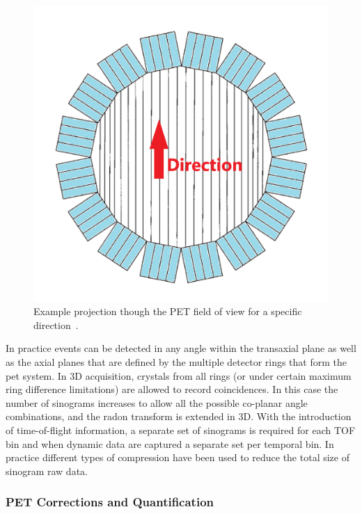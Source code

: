 \begin{itemize}
\begin{figure} [h!]
\includegraphics[scale=0.15,angle=0]{2_Theory_Methods/figures/Sinogram_detector_to_Sino.png}
\caption{Example projection though the PET field of view for a specific direction~\cite{Fahey2002}.} 
\label{fig_2:Sinogram_detector_to_Sino}
\end{figure} 
%
In practice events can be detected in any angle within the transaxial plane as well as the axial planes that are defined by the multiple detector rings that form the \gls{pet} system. In 3D acquisition, crystals from all rings (or under certain maximum ring difference limitations) are allowed to record coincidences. In this case the number of sinograms increases to allow all the possible co-planar angle combinations, and the radon transform is extended in 3D. With the introduction of time-of-flight information, a separate set of sinograms is required for each TOF bin and when dynamic data are captured a separate set per temporal bin. In practice different types of compression have been used to reduce the total size of sinogram raw data.

\end{itemize}

\subsubsection{PET Corrections and Quantification}

